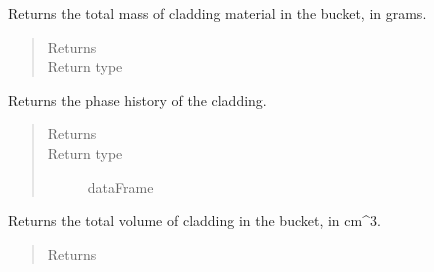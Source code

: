 \documentclass[letterpaper,10pt,openany,oneside,english]{sphinxmanual}
\begin{document}
\begin{fulllineitems}

\begin{fulllineitems}
\label{\detokenize{support_rst/fuel_bucket:fuel_bucket.FuelBucket.cladding_mass}}
Returns the total mass of cladding material in the bucket, in grams.
\begin{quote}\begin{description}
\item[{Returns}] \leavevmode
{}

\item[{Return type}] \leavevmode
{}

\end{description}\end{quote}

\end{fulllineitems}


\begin{fulllineitems}
\label{\detokenize{support_rst/fuel_bucket:fuel_bucket.FuelBucket.cladding_phase}}
Returns the phase history of the cladding.
\begin{quote}\begin{description}
\item[{Returns}] \leavevmode
{}

\item[{Return type}] \leavevmode
dataFrame

\end{description}\end{quote}

\end{fulllineitems}


\begin{fulllineitems}
\label{\detokenize{support_rst/fuel_bucket:fuel_bucket.FuelBucket.cladding_volume}}
Returns the total volume of cladding in the bucket, in cm\textasciicircum{}3.
\begin{quote}\begin{description}
\item[{Returns}] \leavevmode
{}


\end{description}
\end{quote}
\end{fulllineitems}
\end{fulllineitems}
\end{document}
